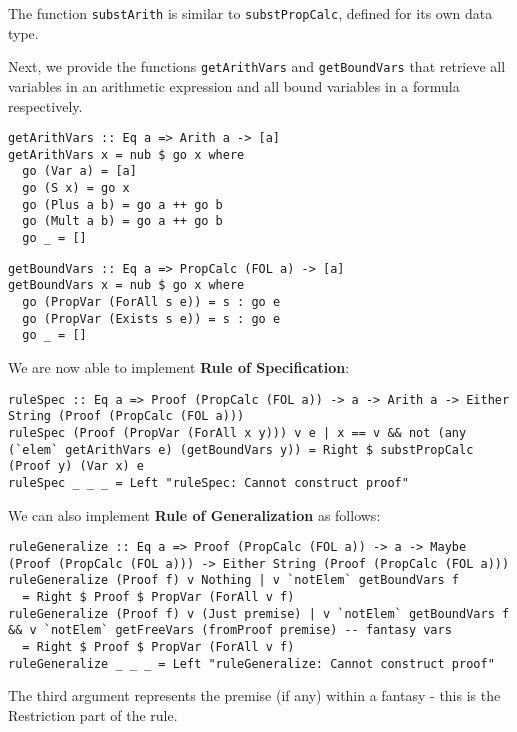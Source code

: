 \documentclass{article}
\begin{document}
The function \texttt{substArith} is similar to \texttt{substPropCalc}, defined for its own data type.

Next, we provide the functions \texttt{getArithVars} and \texttt{getBoundVars} that retrieve all variables in an arithmetic expression and all bound variables in a formula respectively.

\begin{minipage}{0.49\textwidth}
\begin{lstlisting}
getArithVars :: Eq a => Arith a -> [a]
getArithVars x = nub $ go x where
  go (Var a) = [a]
  go (S x) = go x
  go (Plus a b) = go a ++ go b
  go (Mult a b) = go a ++ go b
  go _ = []
\end{lstlisting}
\end{minipage}
\begin{minipage}{0.49\textwidth}
\begin{lstlisting}
getBoundVars :: Eq a => PropCalc (FOL a) -> [a]
getBoundVars x = nub $ go x where
  go (PropVar (ForAll s e)) = s : go e
  go (PropVar (Exists s e)) = s : go e
  go _ = []
\end{lstlisting}
\end{minipage}

We are now able to implement \textbf{Rule of Specification}:

\begin{lstlisting}
ruleSpec :: Eq a => Proof (PropCalc (FOL a)) -> a -> Arith a -> Either String (Proof (PropCalc (FOL a)))
ruleSpec (Proof (PropVar (ForAll x y))) v e | x == v && not (any (`elem` getArithVars e) (getBoundVars y)) = Right $ substPropCalc (Proof y) (Var x) e
ruleSpec _ _ _ = Left "ruleSpec: Cannot construct proof"
\end{lstlisting}

We can also implement \textbf{Rule of Generalization} as follows:

\begin{lstlisting}
ruleGeneralize :: Eq a => Proof (PropCalc (FOL a)) -> a -> Maybe (Proof (PropCalc (FOL a))) -> Either String (Proof (PropCalc (FOL a)))
ruleGeneralize (Proof f) v Nothing | v `notElem` getBoundVars f
  = Right $ Proof $ PropVar (ForAll v f)
ruleGeneralize (Proof f) v (Just premise) | v `notElem` getBoundVars f && v `notElem` getFreeVars (fromProof premise) -- fantasy vars
  = Right $ Proof $ PropVar (ForAll v f)
ruleGeneralize _ _ _ = Left "ruleGeneralize: Cannot construct proof"
\end{lstlisting}

The third argument represents the premise (if any) within a fantasy - this is the Restriction part of the rule.
\end{document}
